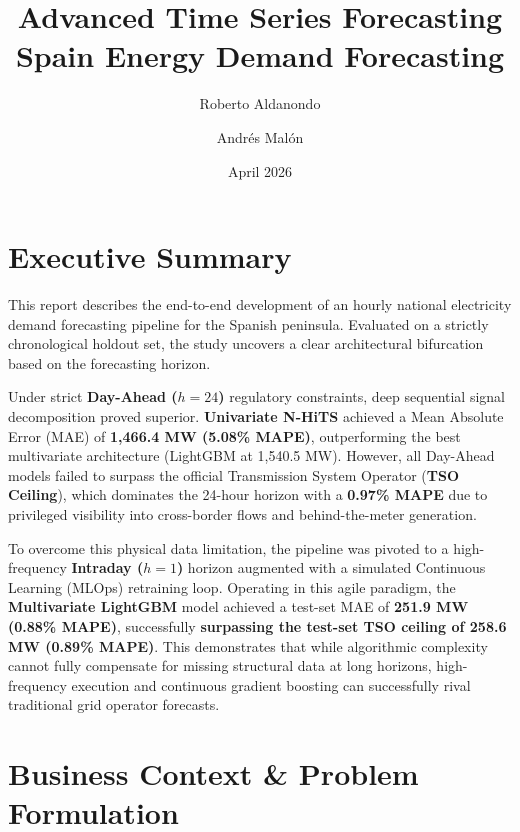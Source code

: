 \documentclass{article}
\title{Advanced Time Series Forecasting \\ \large Spain Energy Demand Forecasting}
\author{Roberto Aldanondo \and Andrés Malón}
\date{April 2026}
\begin{document}
\maketitle

\section{Executive Summary}

This report describes the end-to-end development of an hourly national electricity demand forecasting pipeline for the Spanish peninsula. Evaluated on a strictly chronological holdout set, the study uncovers a clear architectural bifurcation based on the forecasting horizon.

Under strict \textbf{Day-Ahead ($h=24$)} regulatory constraints, deep sequential signal decomposition proved superior. \textbf{Univariate N-HiTS} achieved a Mean Absolute Error (MAE) of \textbf{1,466.4 MW (5.08\% MAPE)}, outperforming the best multivariate architecture (LightGBM at 1,540.5 MW). However, all Day-Ahead models failed to surpass the official Transmission System Operator (\textbf{TSO Ceiling}), which dominates the 24-hour horizon with a \textbf{0.97\% MAPE} due to privileged visibility into cross-border flows and behind-the-meter generation.

To overcome this physical data limitation, the pipeline was pivoted to a high-frequency \textbf{Intraday ($h=1$)} horizon augmented with a simulated Continuous Learning (MLOps) retraining loop. Operating in this agile paradigm, the \textbf{Multivariate LightGBM} model achieved a test-set MAE of \textbf{251.9 MW (0.88\% MAPE)}, successfully \textbf{surpassing the test-set TSO ceiling of 258.6 MW (0.89\% MAPE)}. This demonstrates that while algorithmic complexity cannot fully compensate for missing structural data at long horizons, high-frequency execution and continuous gradient boosting can successfully rival traditional grid operator forecasts.

\section{Business Context \& Problem Formulation}
\end{document}
